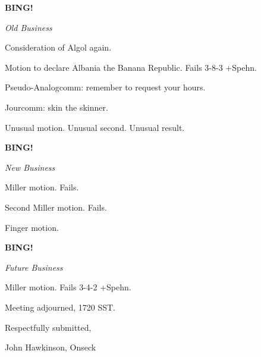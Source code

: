 \documentclass[12pt]{article}
\newcommand{\bing}{{\bf BING!} }
\newcommand{\goto}[1]{\bing \vskip 12pt \centerline{{\em{#1}}}}
\begin{document}
\goto{Old Business}

Consideration of Algol again.

Motion to declare Albania the Banana Republic. Fails 3-8-3 +Spehn.

Pseudo-Analogcomm: remember to request your hours.

Jourcomm: skin the skinner.

Unusual motion. Unusual second. Unusual result.

\goto{New Business}

Miller motion. Fails.

Second Miller motion. Fails.

Finger motion.

\goto{Future Business}

Miller motion. Fails 3-4-2 +Spehn.

\vspace{12pt}

\noindent
Meeting adjourned, 1720 SST.

\vspace{18pt}

\centerline{Respectfully submitted,}
\centerline{John Hawkinson, Onseck}
\end{document}
